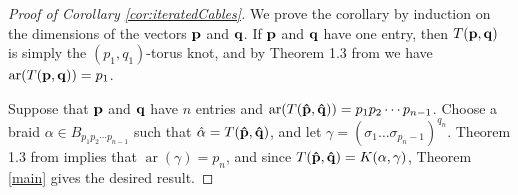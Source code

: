 \documentclass[11pt]{amsart}
\def\ar{\operatorname{ar}}
\theoremstyle{definition}
\begin{document}
\begin{proof}[Proof of Corollary \ref{cor:iteratedCables}]
We prove the corollary by induction on the dimensions of the vectors ${\bf p}$ and ${\bf q}$.  If ${\bf p}$ and ${\bf q}$ have one entry, then $T({\bf p},{\bf q})$ is simply the $(p_1,q_1)$-torus knot, and by Theorem 1.3 from \cite{Cor13b} we have $\ar(T({\bf p},{\bf q})) = p_1$.

Suppose that ${\bf p}$ and ${\bf q}$ have $n$ entries and $\ar(T({\bf \hat p},{\bf \hat q})) = p_1p_2\cdots p_{n-1}$.  Choose a braid $\alpha\in B_{p_1p_2\cdots p_{n-1}}$ such that $\hat\alpha = T({\bf \hat p},{\bf \hat q})$, and let $\gamma = (\sigma_1\ldots \sigma_{p_n-1})^{q_n}$.  Theorem 1.3 from \cite{Cor13b} implies that $\ar(\gamma) = p_n$, and since $T({\bf \hat p},{\bf \hat q}) = K(\alpha,\gamma)$, Theorem \ref{main} gives the desired result.
\end{proof}
\end{document}
